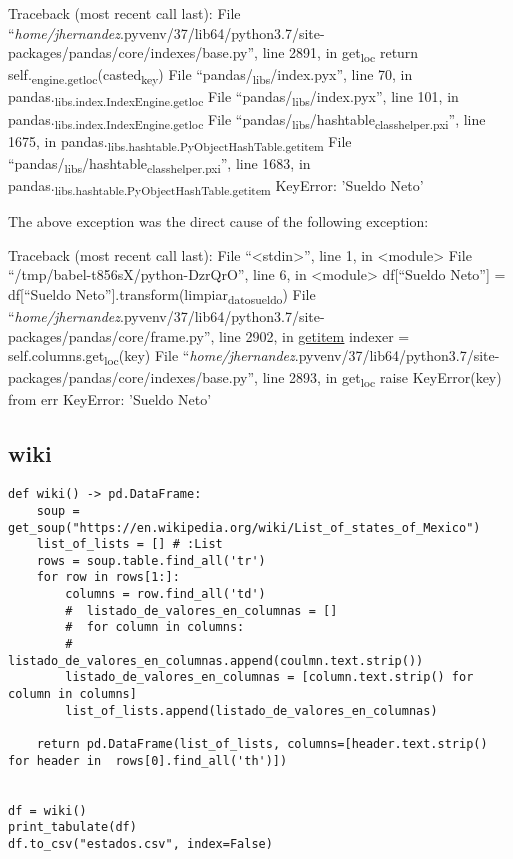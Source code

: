 \documentclass[11pt]{article}
\begin{document}
Traceback (most recent call last):
  File ``\emph{home/jhernandez}.pyvenv/37/lib64/python3.7/site-packages/pandas/core/indexes/base.py'', line 2891, in get\textsubscript{loc}
    return self.\textsubscript{engine.get}\textsubscript{loc}(casted\textsubscript{key})
  File ``pandas/\textsubscript{libs}/index.pyx'', line 70, in pandas.\textsubscript{libs.index.IndexEngine.get}\textsubscript{loc}
  File ``pandas/\textsubscript{libs}/index.pyx'', line 101, in pandas.\textsubscript{libs.index.IndexEngine.get}\textsubscript{loc}
  File ``pandas/\textsubscript{libs}/hashtable\textsubscript{class}\textsubscript{helper.pxi}'', line 1675, in pandas.\textsubscript{libs.hashtable.PyObjectHashTable.get}\textsubscript{item}
  File ``pandas/\textsubscript{libs}/hashtable\textsubscript{class}\textsubscript{helper.pxi}'', line 1683, in pandas.\textsubscript{libs.hashtable.PyObjectHashTable.get}\textsubscript{item}
KeyError: 'Sueldo Neto'

The above exception was the direct cause of the following exception:

Traceback (most recent call last):
  File ``<stdin>'', line 1, in <module>
  File ``/tmp/babel-t856sX/python-DzrQrO'', line 6, in <module>
    df[``Sueldo Neto''] = df[``Sueldo Neto''].transform(limpiar\textsubscript{dato}\textsubscript{sueldo})
  File ``\emph{home/jhernandez}.pyvenv/37/lib64/python3.7/site-packages/pandas/core/frame.py'', line 2902, in \uline{\uline{getitem}}
    indexer = self.columns.get\textsubscript{loc}(key)
  File ``\emph{home/jhernandez}.pyvenv/37/lib64/python3.7/site-packages/pandas/core/indexes/base.py'', line 2893, in get\textsubscript{loc}
    raise KeyError(key) from err
KeyError: 'Sueldo Neto'


\subsection{wiki}
\label{sec:org962fbd3}
\begin{verbatim}
def wiki() -> pd.DataFrame:
    soup = get_soup("https://en.wikipedia.org/wiki/List_of_states_of_Mexico")
    list_of_lists = [] # :List
    rows = soup.table.find_all('tr')
    for row in rows[1:]:
        columns = row.find_all('td')
        #  listado_de_valores_en_columnas = []
        #  for column in columns:
        #    listado_de_valores_en_columnas.append(coulmn.text.strip())
        listado_de_valores_en_columnas = [column.text.strip() for column in columns]
        list_of_lists.append(listado_de_valores_en_columnas)

    return pd.DataFrame(list_of_lists, columns=[header.text.strip() for header in  rows[0].find_all('th')])


df = wiki()
print_tabulate(df)
df.to_csv("estados.csv", index=False)
\end{verbatim}
\end{document}
